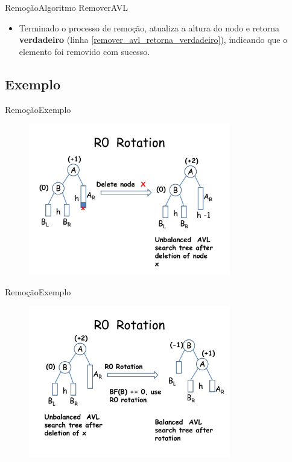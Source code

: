 \documentclass[aspectratio=169]{beamer}
\begin{document}

\begin{frame}{Remoção}{Algoritmo RemoverAVL}
\begin{itemize}
\item Terminado o processo de remoção, atualiza a altura do nodo e retorna {\bf verdadeiro} (linha \ref{remover_avl_retorna_verdadeiro}), indicando que o elemento foi removido com sucesso.
\end{itemize}
\end{frame}

\subsection{Exemplo}

\begin{frame}{Remoção}{Exemplo}
\begin{figure}[!h]
  \centering
  \includegraphics[width=250pt]{imagens/exemplo_remocao1.png}
  \label{fig_exemplo_remocao1}
\end{figure}
\end{frame}



\begin{frame}{Remoção}{Exemplo}
\begin{figure}[!h]
  \centering
  \includegraphics[width=250pt]{imagens/exemplo_remocao2.png}
  \label{fig_exemplo_remocao2}
\end{figure}
\end{frame}
\end{document}
